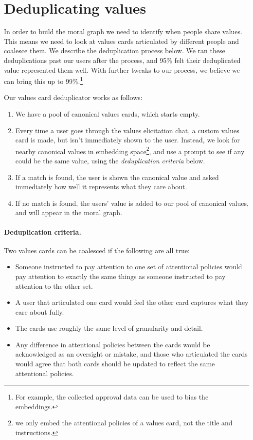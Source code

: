 \documentclass{article}
\theoremstyle{definition}
\begin{document}
\section{Deduplicating values}\label{sec:deduplicatingvalues}

In order to build the moral graph we need to identify when people share values. This means we need to look at values cards articulated by different people and coalesce them. We describe the deduplication process below. We ran these deduplications past our users after the process, and 95\% felt their deduplicated value represented them well. With further tweaks to our process, we believe we can bring this up to 99\%.\footnote{For example, the collected approval data can be used to bias the embeddings.}

Our values card deduplicator works as follows:
\begin{enumerate}
\item We have a pool of canonical values cards, which starts empty.
\item Every time a user goes through the values elicitation chat, a custom values card is made, but isn’t immediately shown to the user. Instead, we look for nearby canonical values in embedding space\footnote{we only embed the attentional policies of a values card, not the title and instructions.}, and use a prompt to see if any could be the same value, using the \textit{deduplication criteria} below. 
\item If a match is found, the user is shown the canonical value and asked immediately how well it represents what they care about.
\item If no match is found, the users’ value is added to our pool of canonical values, and will appear in the moral graph.
\end{enumerate}

\paragraph{Deduplication criteria.} Two values cards can be coalesced if the following are all true:
\begin{itemize}
\item Someone instructed to pay attention to one set of attentional policies would pay attention to exactly the same things as someone instructed to pay attention to the other set.
\item A user that articulated one card would feel the other card captures what they care about fully.
\item The cards use roughly the same level of granularity and detail.
\item Any difference in attentional policies between the cards would be acknowledged as an oversight or mistake, and those who articulated the cards would agree that both cards should be updated to reflect the same attentional policies.
\end{itemize}
\end{document}
